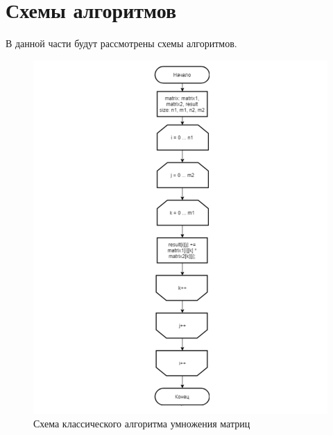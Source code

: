 \documentclass[12pt]{report}
\begin{document}
\section{Схемы алгоритмов}
В данной части будут рассмотрены схемы алгоритмов.

\begin{figure}[!htbp]
	\centering
	\includegraphics[scale=1]{m_std.png}
	\caption{Схема классического алгоритма умножения матриц}
	\label{fig:mpr}
\end{figure}
\end{document}

